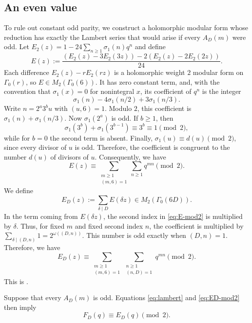 \documentclass[11pt]{amsart}
\theoremstyle{remark}
\numberwithin{equation}{section}
\begin{document}
\subsection{An even value}

To rule out constant odd parity, we construct a holomorphic modular form
whose reduction has exactly the Lambert series that would arise if every
$A_D(m)$ were odd.
Let $E_2(z)=1-24\sum_{n\geq1}\sigma_1(n)q^n$ and define
\begin{equation}\label{eq:E}
 E(z):=\frac{(E_2(z)-3E_2(3z))-2(E_2(z)-2E_2(2z))}{24}.
\end{equation}
Each difference $E_2(z)-rE_2(rz)$ is a holomorphic weight $2$ modular form
on $\Gamma_0(r)$, so $E\in M_2(\Gamma_0(6))$.  It has zero constant term,
and, with the convention that $\sigma_1(x)=0$ for nonintegral $x$, its
coefficient of $q^n$ is the integer
\[
 \sigma_1(n)-4\sigma_1(n/2)+3\sigma_1(n/3).
\]
Write $n=2^a3^bu$ with $(u,6)=1$.  Modulo $2$, this coefficient is
$\sigma_1(n)+\sigma_1(n/3)$.  Now $\sigma_1(2^a)$ is odd.  If $b\geq1$, then
\[
 \sigma_1(3^b)+\sigma_1(3^{b-1})\equiv3^b\equiv1\pmod2,
\]
while for $b=0$ the second term is absent.  Finally,
$\sigma_1(u)\equiv d(u)\pmod2$, since every divisor of $u$ is odd.  Therefore, the
coefficient is congruent to the number $d(u)$ of divisors of $u$.
Consequently, we have
\begin{equation}\label{eq:E-mod2}
 E(z)\equiv
 \sum_{\substack{m\geq1\\(m,6)=1}}
 \sum_{n\geq1}q^{mn}\pmod2.
\end{equation}
We define
\begin{equation}\label{eq:ED}
 E_D(z):=\sum_{\delta\mid D}E(\delta z)\in M_2(\Gamma_0(6D)).
\end{equation}
In the term coming from $E(\delta z)$, the second index in
\eqref{eq:E-mod2} is multiplied by $\delta$.  Thus, for fixed $m$ and fixed
second index $n$, the coefficient is multiplied by
$\sum_{\delta\mid(D,n)}1=2^{\omega((D,n))}$.  This number is odd exactly when
$(D,n)=1$.  Therefore, we have
\begin{equation}\label{eq:ED-mod2}
 E_D(z)\equiv
 \sum_{\substack{m\geq1\\(m,6)=1}}
 \sum_{\substack{n\geq1\\(n,D)=1}}q^{mn}\pmod2.
\end{equation}
This is \cite[equation~(3.8)]{Ono2010}.

Suppose that every $A_D(m)$ is odd.  Equations
\eqref{eq:lambert} and \eqref{eq:ED-mod2} then imply
\begin{equation}\label{eq:F-equals-E}
 F_D(q)\equiv E_D(q)\pmod2.
\end{equation}
\end{document}
